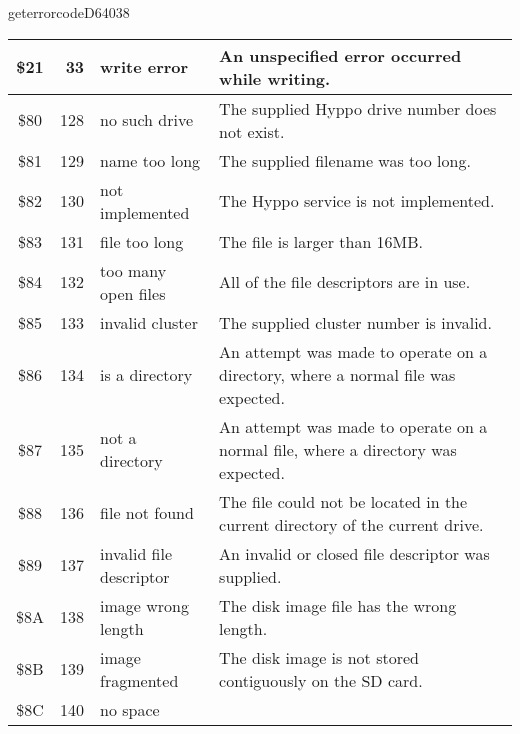\begin{hyppotrap}{geterrorcode}{D640}{38}
{\begin{longtable}{|c|r|l|p{8cm}|}
    \\\hline
    \index{Hyppo Error Codes!\$21}
    \$21 & 33 & write error &
    An unspecified error occurred while writing.
    \\\hline
    \index{Hyppo Error Codes!\$80}
    \$80 & 128 & no such drive &
    The supplied Hyppo drive number does not exist.
    \\\hline
    \index{Hyppo Error Codes!\$81}
    \$81 & 129 & {name too long} &
    The supplied filename was too long.
    \\\hline
    \index{Hyppo Error Codes!\$82}
    \$82 & 130 & not implemented &
    The Hyppo service is not implemented.
    \\\hline
    \index{Hyppo Error Codes!\$83}
    \$83 & 131 & file too long &
    The file is larger than 16MB.
    \\\hline
    \index{Hyppo Error Codes!\$84}
    \$84 & 132 & \makecell[tl]{too many\\open files} &
    All of the file descriptors are in use.
    \\\hline
    \index{Hyppo Error Codes!\$85}
    \$85 & 133 & invalid cluster &
    The supplied cluster number is invalid.
    \\\hline
    \index{Hyppo Error Codes!\$86}
    \$86 & 134 & is a directory &
    An attempt was made to operate on a directory, where a normal file was
    expected.
    \\\hline
    \index{Hyppo Error Codes!\$87}
    \$87 & 135 & not a directory &
    An attempt was made to operate on a normal file, where a directory was
    expected.
    \\\hline
    \index{Hyppo Error Codes!\$88}
    \$88 & 136 & file not found &
    The file could not be located in the current directory of the current drive.
    \\\hline
    \index{Hyppo Error Codes!\$89}
    \$89 & 137 & \makecell[tl]{invalid file\\descriptor} &
    An invalid or closed file descriptor was supplied.
    \\\hline
    \index{Hyppo Error Codes!\$8A}
    \$8A & 138 & \makecell[tl]{image wrong\\length} &
    The disk image file has the wrong length.
    \\\hline
    \index{Hyppo Error Codes!\$8B}
    \$8B & 139 & image fragmented &
    The disk image is not stored contiguously on the SD card.
    \\\hline
    \index{Hyppo Error Codes!\$8C}
    \$8C & 140 & no space &

\end{longtable}}
\end{hyppotrap}
